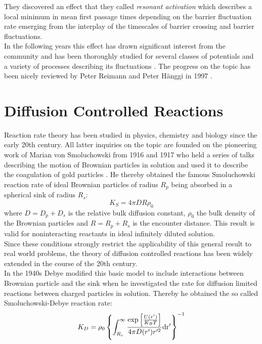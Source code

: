  They discovered an effect that they called \emph{resonant activation} which describes a local minimum in mean first passage times depending on the barrier fluctuation rate emerging from the interplay of the timescales of barrier crossing and barrier fluctuations. \\
In the following years this effect has drawn significant interest from the community and has been thoroughly studied for several classes of potentials and a variety of processes describing its fluctuations \cite{Zurcher1993, Pechukas1994, Reimann1995, Reimann1995a}. The progress on the topic has been nicely reviewed by Peter Reimann and Peter H\"{a}nggi in 1997 \cite{Reimann1997}.

\section{Diffusion Controlled Reactions}
Reaction rate theory has been studied in physics, chemistry and biology since the early 20th century. All latter inquiries on the topic are founded on the pioneering work of Marian von Smoluchowski from 1916 and 1917 who held a series of talks \cite{Smoluchowski1916} describing the motion of Brownian particles in solution and used it to describe the coagulation of gold particles \cite{Smoluchowski1917a}. He thereby obtained the famous Smoluchowski reaction rate of ideal Brownian particles of radius $R_p$ being absorbed in a spherical sink of radius $R_s$:\\
\begin{equation}
    K_S = 4 \pi D R \rho_0 \nonumber
    \label{Ksintro}
\end{equation}
where $D = D_p + D_s$ is the relative bulk diffusion constant, $\rho_0$ the bulk density of the Brownian particles and $R = R_p + R_s$ is the encounter distance. This result is valid for noninteracting reactants in ideal infinitely diluted solution. \\ 
Since these conditions strongly restrict the applicability of this general result to real world problems, the theory of diffusion controlled reactions has been widely extended in the course of the 20th century.\\
In the 1940s Debye \cite{Debye1942} modified this basic model to include interactions between Brownian particle and the sink when he investigated the rate for diffusion limited reactions between charged particles in solution. Thereby he obtained the so called Smoluchowski-Debye reaction rate:
\begin{equation}
    K_D = \rho_0\left\{\int_{R_s}^{\infty} \frac{\exp \left[ \frac{U(r')}{K_B T}\right]}{4 \pi D(r') r'^2} \rm d r' \right\}^{-1} \nonumber
    \label{Kdintro}
\end{equation}
